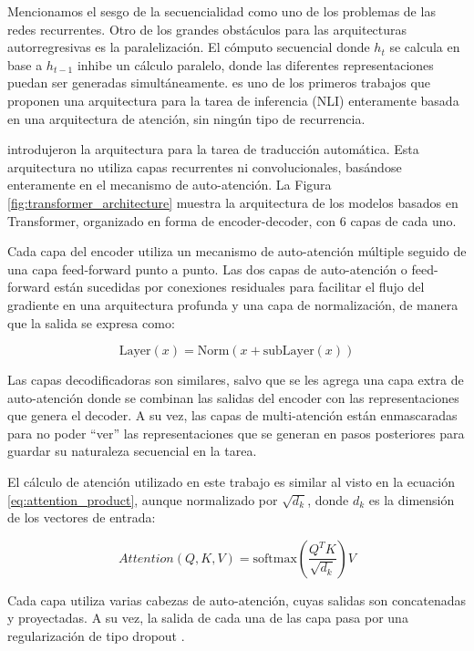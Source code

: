 Mencionamos el sesgo de la secuencialidad como uno de los problemas de las redes recurrentes. Otro de los grandes obstáculos para las arquitecturas autorregresivas es la paralelización. El cómputo secuencial donde $h_t$ se calcula en base a $h_{t-1}$ inhibe un cálculo paralelo, donde las diferentes representaciones puedan ser generadas simultáneamente. \citet{parikh-etal-2016-decomposable} es uno de los primeros trabajos que proponen una arquitectura para la tarea de inferencia (NLI) enteramente basada en una arquitectura de atención, sin ningún tipo de recurrencia.

\citet{vaswani2017attention} introdujeron la arquitectura  para la tarea de traducción automática. Esta arquitectura no utiliza capas recurrentes ni convolucionales, basándose enteramente en el mecanismo de auto-atención. La Figura \ref{fig:transformer_architecture} muestra la arquitectura de los modelos basados en Transformer, organizado en forma de encoder-decoder, con 6 capas de cada uno.

Cada capa del encoder utiliza un mecanismo de auto-atención múltiple seguido de una capa feed-forward punto a punto. Las dos capas de auto-atención o feed-forward están sucedidas por conexiones residuales \cite{he2016deep} para facilitar el flujo del gradiente en una arquitectura profunda y una capa de normalización, de manera que la salida se expresa como:

\begin{equation*}
    \text{Layer}(x) = \text{Norm}(x + \text{subLayer}(x))
\end{equation*}

Las capas decodificadoras son similares, salvo que se les agrega una capa extra de auto-atención donde se combinan las salidas del encoder con las representaciones que genera el decoder. A su vez, las capas de multi-atención están enmascaradas para no poder ``ver'' las representaciones que se generan en pasos posteriores para guardar su naturaleza secuencial en la tarea.

El cálculo de atención utilizado en este trabajo es similar al visto en la ecuación \ref{eq:attention_product}, aunque normalizado por $\sqrt{d_k}$, donde $d_k$ es la dimensión de los vectores de entrada:

\begin{equation*}
    Attention(Q, K, V) = \text{softmax}(\frac{Q^T K}{\sqrt{d_k}}) V
\end{equation*}

Cada capa utiliza varias cabezas de auto-atención, cuyas salidas son concatenadas y proyectadas. A su vez, la salida de cada una de las capa pasa por una regularización de tipo dropout \cite{srivastava2014dropout}.

